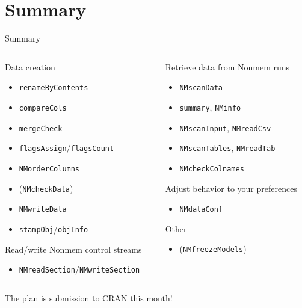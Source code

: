 \documentclass[
  8pt,
  ignorenonframetext,
  aspectratio=169]{beamer}
\providecommand{\tightlist}{%
  \setlength{\itemsep}{0pt}\setlength{\parskip}{0pt}}
\begin{document}
\hypertarget{summary}{%
\section{Summary}\label{summary}}

\begin{frame}[fragile]{Summary}
\begin{columns}[T]
\begin{column}{0.48\textwidth}
Data creation

\begin{itemize}
\tightlist
\item
  \texttt{renameByContents} -
\item
  \texttt{compareCols}
\item
  \texttt{mergeCheck}
\item
  \texttt{flagsAssign}/\texttt{flagsCount}
\item
  \texttt{NMorderColumns}
\item
  (\texttt{NMcheckData})
\item
  \texttt{NMwriteData}
\item
  \texttt{stampObj}/\texttt{objInfo}
\end{itemize}

Read/write Nonmem control streams

\begin{itemize}
\tightlist
\item
  \texttt{NMreadSection}/\texttt{NMwriteSection}
\end{itemize}
\end{column}

\begin{column}{0.48\textwidth}
Retrieve data from Nonmem runs

\begin{itemize}
\tightlist
\item
  \texttt{NMscanData}
\item
  \texttt{summary}, \texttt{NMinfo}
\item
  \texttt{NMscanInput}, \texttt{NMreadCsv}
\item
  \texttt{NMscanTables}, \texttt{NMreadTab}
\item
  \texttt{NMcheckColnames}
\end{itemize}

Adjust behavior to your preferences

\begin{itemize}
\tightlist
\item
  \texttt{NMdataConf}
\end{itemize}

Other

\begin{itemize}
\tightlist
\item
  (\texttt{NMfreezeModels})
\end{itemize}
\end{column}
\end{columns}

\begin{block}{The plan is submission to CRAN this month!}
\protect\hypertarget{the-plan-is-submission-to-cran-this-month}{}
\end{block}
\end{frame}
\end{document}
